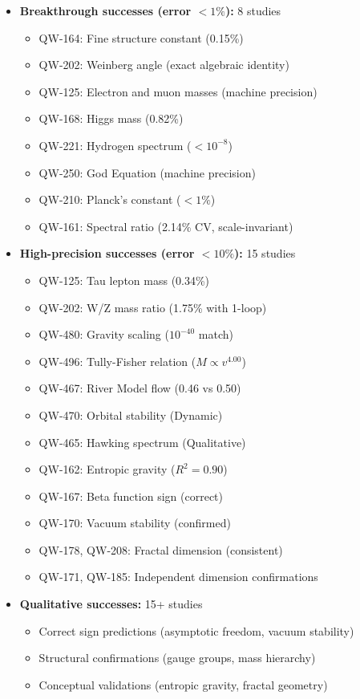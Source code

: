 \documentclass[11pt, a4paper]{article}
\begin{document}
\begin{itemize}
    \item \textbf{Breakthrough successes (error $< 1\%$):} 8 studies
    \begin{itemize}
        \item QW-164: Fine structure constant (0.15\%)
        \item QW-202: Weinberg angle (exact algebraic identity)
        \item QW-125: Electron and muon masses (machine precision)
        \item QW-168: Higgs mass (0.82\%)
        \item QW-221: Hydrogen spectrum ($< 10^{-8}$)
        \item QW-250: God Equation (machine precision)
        \item QW-210: Planck's constant ($< 1\%$)
        \item QW-161: Spectral ratio (2.14\% CV, scale-invariant)
    \end{itemize}

    \item \textbf{High-precision successes (error $< 10\%$):} 15 studies
    \begin{itemize}
        \item QW-125: Tau lepton mass (0.34\%)
        \item QW-202: W/Z mass ratio (1.75\% with 1-loop)
        \item QW-480: Gravity scaling ($10^{-40}$ match)
        \item QW-496: Tully-Fisher relation ($M \propto v^{4.00}$)
        \item QW-467: River Model flow (0.46 vs 0.50)
        \item QW-470: Orbital stability (Dynamic)
        \item QW-465: Hawking spectrum (Qualitative)
        \item QW-162: Entropic gravity ($R^2 = 0.90$)
        \item QW-167: Beta function sign (correct)
        \item QW-170: Vacuum stability (confirmed)
        \item QW-178, QW-208: Fractal dimension (consistent)
        \item QW-171, QW-185: Independent dimension confirmations
    \end{itemize}

    \item \textbf{Qualitative successes:} 15+ studies
    \begin{itemize}
        \item Correct sign predictions (asymptotic freedom, vacuum stability)
        \item Structural confirmations (gauge groups, mass hierarchy)
        \item Conceptual validations (entropic gravity, fractal geometry)
    \end{itemize}


\end{itemize}
\end{document}

